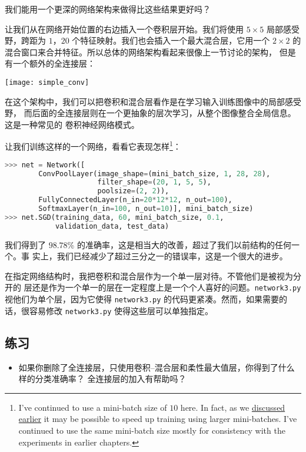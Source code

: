 我们能用一个更深的网络架构来做得比这些结果更好吗？

让我们从在网络开始位置的右边插入一个卷积层开始。我们将使用 $5 \times 5$ 局部感受
野，跨距为 $1$，$20$ 个特征映射。我们也会插入一个最大混合层，它用一个 $2
\times 2$ 的混合窗口来合并特征。所以总体的网络架构看起来很像上一节讨论的架构，
但是有一个额外的全连接层：
\begin{center}
  \texttt{[image: simple\_conv]}  
\end{center}

在这个架构中，我们可以把卷积和混合层看作是在学习输入训练图像中的局部感受野，
而后面的全连接层则在一个更抽象的层次学习，从整个图像整合全局信息。这是一种常见的
卷积神经网络模式。

让我们训练这样的一个网络，看看它表现怎样\footnote{I've continued to use a
  mini-batch size of $10$ here. In fact, as we
  \hyperref[mini_batch_size]{discussed earlier} it may be possible to speed up
  training using larger mini-batches. I've continued to use the same mini-batch
  size mostly for consistency with the experiments in earlier chapters.}：

\begin{lstlisting}[language=Python]
>>> net = Network([
        ConvPoolLayer(image_shape=(mini_batch_size, 1, 28, 28), 
                      filter_shape=(20, 1, 5, 5), 
                      poolsize=(2, 2)),
        FullyConnectedLayer(n_in=20*12*12, n_out=100),
        SoftmaxLayer(n_in=100, n_out=10)], mini_batch_size)
>>> net.SGD(training_data, 60, mini_batch_size, 0.1, 
            validation_data, test_data)
\end{lstlisting}

我们得到了 $98.78$\% 的准确率，这是相当大的改善，超过了我们以前结构的任何一个。事
实上，我们已经减少了超过三分之一的错误率，这是一个很大的进步。

在指定网络结构时，我把卷积和混合层作为一个单一层对待。不管他们是被视为分开的
层还是作为一个单一的层在一定程度上是一个个人喜好的问题。\lstinline!network3.py!
视他们为单个层，因为它使得 \lstinline!network3.py! 的代码更紧凑。然而，如果需要的
话，很容易修改 \lstinline!network3.py! 使得这些层可以单独指定。

\subsection*{练习}

\begin{itemize}
\item 如果你删除了全连接层，只使用卷积--混合层和柔性最大值层，你得到了什么样的分类准确率？
全连接层的加入有帮助吗？
\end{itemize}

